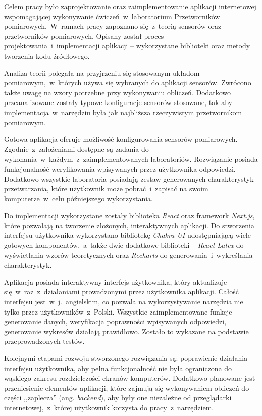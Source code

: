 Celem pracy było zaprojektowanie oraz zaimplementowanie aplikacji internetowej wspomagającej
wykonywanie ćwiczeń~w~laboratorium Przetworników pomiarowych.~W~ramach pracy zapoznano się~z~teorią
sensorów oraz przetworników pomiarowych. Opisany został proces projektowania~i~implementacji
aplikacji -- wykorzystane biblioteki oraz metody tworzenia kodu źródłowego.

Analiza teorii polegała na przyjrzeniu się stosowanym układom pomiarowym,~w~których używa się
wybranych do aplikacji sensorów. Zwrócono także uwagę na wzory potrzebne przy wykonywaniu obliczeń.
Dodatkowo przeanalizowane zostały typowe konfiguracje sensorów stosowane, tak aby
implementacja~w~narzędziu była jak najbliższa rzeczywistym przetwornikom pomiarowym.

Gotowa aplikacja oferuje możliwość konfigurowania sensorów pomiarowych. Zgodnie~z~założeniami
dostępne są zadania do wykonania~w~każdym~z~zaimplementowanych laboratoriów. Rozwiązanie posiada
funkcjonalność weryfikowania wpisywanych przez użytkownika odpowiedzi. Dodatkowo wszystkie
laboratoria posiadają zestaw generowanych charakterystyk przetwarzania, które użytkownik może
pobrać~i~zapisać na swoim komputerze~w~celu późniejszego wykorzystania.

Do implementacji wykorzystane zostały biblioteka \textit{React} oraz framework \textit {Next.js},
które pozwalają na tworzenie złożonych, interaktywnych aplikacji. Do stworzenia interfejsu
użytkownika wykorzystano bibliotekę \textit{Chakra UI} udostępniającą wiele gotowych
komponentów,~a~także dwie dodatkowe biblioteki -- \textit{React Latex} do wyświetlania wzorów
teoretycznych oraz \textit{Recharts} do generowania~i~wykreślania charakterystyk.

Aplikacja posiada interaktywny interfejs użytkownika, który aktualizuje się~w~raz~z~działaniami
prowadzonymi przez użytkownika aplikacji. Całość interfejsu jest~w~j.~angielskim, co pozwala na
wykorzystywanie narzędzia nie tylko przez użytkowników~z~Polski. Wszystkie zaimplementowane
funkcje -- generowanie danych, weryfikacja poprawności wpisywanych odpowiedzi, generowanie wykresów
działają prawidłowo. Zostało to wykazane na podstawie przeprowadzonych testów.

Kolejnymi etapami rozwoju stworzonego rozwiązania są: poprawienie działania interfejsu użytkownika,
aby pełna funkcjonalność nie była ograniczona do wąskiego zakresu rozdzielczości ekranów
komputerów. Dodatkowo planowane jest przeniesienie elementów aplikacji, które zajmują się
wykonywaniem obliczeń do części ,,zaplecza'' (ang. \textit{backend}), aby były one niezależne od
przeglądarki internetowej,~z~której użytkownik korzysta do pracy~z~narzędziem.